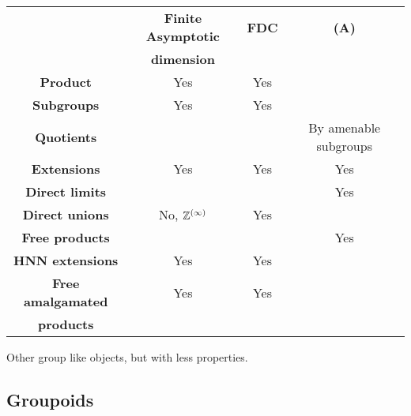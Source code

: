 \begin{table}[h]
\begin{tabular}{c|c|c|c|}
\cline{2-4}
                                                         & \textbf{Finite Asymptotic }              & \textbf{FDC} & \textbf{(A)}    \\ 
							 & \textbf{dimension}                       &              &              \\ \hline
\multicolumn{1}{|c|}{\textbf{Product}}                   &              Yes     &            Yes    &                             \\ \hline
\multicolumn{1}{|c|}{\textbf{Subgroups}}                 &              Yes     &           Yes     &                             \\ \hline
\multicolumn{1}{|c|}{\textbf{Quotients}}                 &                      &                   &     By amenable subgroups   \\ \hline
\multicolumn{1}{|c|}{\textbf{Extensions}}                &            Yes       &            Yes    &     Yes                     \\ \hline
\multicolumn{1}{|c|}{\textbf{Direct limits}}             &                      &                   &     Yes                     \\ \hline
\multicolumn{1}{|c|}{\textbf{Direct unions}}             & No, $\mathbb Z ^{(\infty)}$ &            Yes    &                             \\ \hline
\multicolumn{1}{|c|}{\textbf{Free products}}             &                      &                   &     Yes                     \\ \hline
\multicolumn{1}{|c|}{\textbf{HNN extensions}}            &          Yes         &             Yes   &                             \\ \hline
\multicolumn{1}{|c|}{\textbf{Free amalgamated }}         &           Yes        &              Yes  &                             \\ 
\multicolumn{1}{|c|}{\textbf{ products}}                 &                      &                   &                             \\ \hline
\end{tabular}  
\end{table}

\newpage
Other group like objects, but with less properties.

\subsection{Groupoids}

